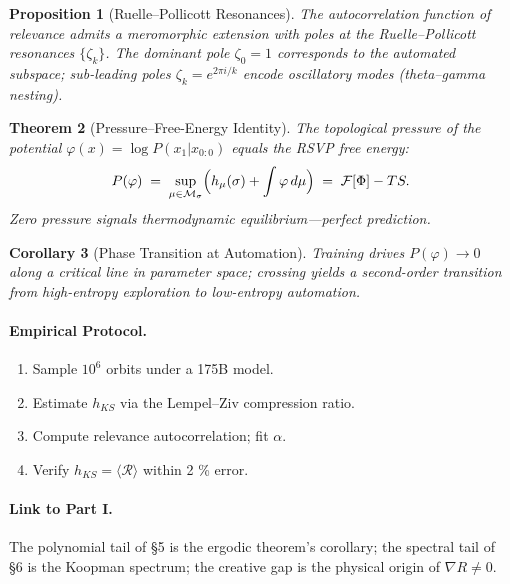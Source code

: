 \documentclass[12pt,a4paper,twoside,openright]{book}
\newtheorem{theorem}{Theorem}
\newtheorem{proposition}[theorem]{Proposition}
\newtheorem{corollary}[theorem]{Corollary}
\begin{document}
\begin{proposition}[Ruelle–Pollicott Resonances]
The autocorrelation function of relevance admits a meromorphic extension with poles at the Ruelle–Pollicott resonances \(\{\zeta_k\}\).
The dominant pole \(\zeta_0=1\) corresponds to the automated subspace; sub-leading poles \(\zeta_k=e^{2\pi i/k}\) encode oscillatory modes (theta–gamma nesting).
\end{proposition}

\begin{theorem}[Pressure–Free-Energy Identity]
The topological pressure of the potential \(\varphi(x)=\log P(x_1|x_{0:0})\) equals the RSVP free energy:
\[
P(\varphi)
\;=\;
\sup_{\mu\in\mathcal{M}_\sigma}\Bigl(h_\mu(\sigma)+\int\varphi\,d\mu\Bigr)
\;=\;
\mathcal{F}[\Phi]-TS.
\]
Zero pressure signals thermodynamic equilibrium—perfect prediction.
\end{theorem}

\begin{corollary}[Phase Transition at Automation]
Training drives \(P(\varphi)\to0\) along a critical line in parameter space; crossing yields a second-order transition from high-entropy exploration to low-entropy automation.
\end{corollary}

\paragraph{Empirical Protocol.}
\begin{enumerate}
\item Sample \(10^6\) orbits under a 175B model.
\item Estimate \(h_{KS}\) via the Lempel–Ziv compression ratio.
\item Compute relevance autocorrelation; fit \(\alpha\).
\item Verify \(h_{KS}=\langle\mathcal{R}\rangle\) within 2 \% error.
\end{enumerate}

\paragraph{Link to Part I.}
The polynomial tail of §5 is the ergodic theorem’s corollary; the spectral tail of §6 is the Koopman spectrum; the creative gap is the physical origin of \(\nabla R\neq0\).

\end{document}
